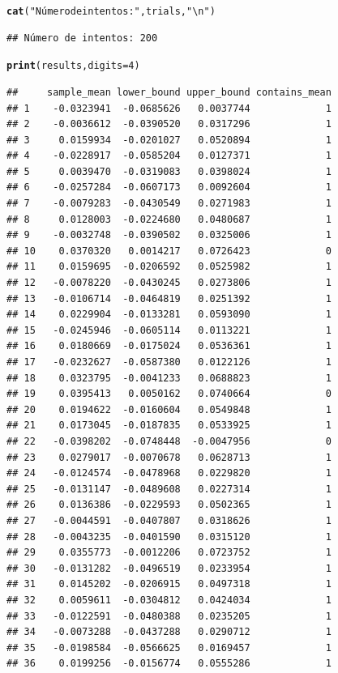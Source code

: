\documentclass[12pt]{article}\usepackage[]{graphicx}\usepackage[]{xcolor}
\makeatletter
\newcommand{\hlnum}[1]{\textcolor[rgb]{0.686,0.059,0.569}{#1}}%
\newcommand{\hlsng}[1]{\textcolor[rgb]{0.192,0.494,0.8}{#1}}%
\newcommand{\hldef}[1]{\textcolor[rgb]{0.345,0.345,0.345}{#1}}%
\newcommand{\hlkwc}[1]{\textcolor[rgb]{0.333,0.667,0.333}{#1}}%
\newcommand{\hlkwd}[1]{\textcolor[rgb]{0.737,0.353,0.396}{\textbf{#1}}}%
\newenvironment{kframe}{%
 \def\at@end@of@kframe{}%
 \ifinner\ifhmode%
  \def\at@end@of@kframe{\end{minipage}}%
  \begin{minipage}{\columnwidth}%
 \fi\fi%
 \def\FrameCommand##1{\hskip\@totalleftmargin \hskip-\fboxsep
 \colorbox{shadecolor}{##1}\hskip-\fboxsep
     \hskip-\linewidth \hskip-\@totalleftmargin \hskip\columnwidth}%
 \MakeFramed {\advance\hsize-\width
   \@totalleftmargin\z@ \linewidth\hsize
   \@setminipage}}%
 {\par\unskip\endMakeFramed%
 \at@end@of@kframe}
\newenvironment{knitrout}{}{} %
\makeatother
\begin{document}
\begin{knitrout}
\begin{kframe}
\begin{alltt}
\hlkwd{cat}\hldef{(}\hlsng{"Número de intentos:"}\hldef{, trials,} \hlsng{"\textbackslash{}n"}\hldef{)}
\end{alltt}
\begin{verbatim}
## Número de intentos: 200
\end{verbatim}
\begin{alltt}
\hlkwd{print}\hldef{(results,} \hlkwc{digits}\hldef{=} \hlnum{4}\hldef{)}
\end{alltt}
\begin{verbatim}
##     sample_mean lower_bound upper_bound contains_mean
## 1    -0.0323941  -0.0685626   0.0037744             1
## 2    -0.0036612  -0.0390520   0.0317296             1
## 3     0.0159934  -0.0201027   0.0520894             1
## 4    -0.0228917  -0.0585204   0.0127371             1
## 5     0.0039470  -0.0319083   0.0398024             1
## 6    -0.0257284  -0.0607173   0.0092604             1
## 7    -0.0079283  -0.0430549   0.0271983             1
## 8     0.0128003  -0.0224680   0.0480687             1
## 9    -0.0032748  -0.0390502   0.0325006             1
## 10    0.0370320   0.0014217   0.0726423             0
## 11    0.0159695  -0.0206592   0.0525982             1
## 12   -0.0078220  -0.0430245   0.0273806             1
## 13   -0.0106714  -0.0464819   0.0251392             1
## 14    0.0229904  -0.0133281   0.0593090             1
## 15   -0.0245946  -0.0605114   0.0113221             1
## 16    0.0180669  -0.0175024   0.0536361             1
## 17   -0.0232627  -0.0587380   0.0122126             1
## 18    0.0323795  -0.0041233   0.0688823             1
## 19    0.0395413   0.0050162   0.0740664             0
## 20    0.0194622  -0.0160604   0.0549848             1
## 21    0.0173045  -0.0187835   0.0533925             1
## 22   -0.0398202  -0.0748448  -0.0047956             0
## 23    0.0279017  -0.0070678   0.0628713             1
## 24   -0.0124574  -0.0478968   0.0229820             1
## 25   -0.0131147  -0.0489608   0.0227314             1
## 26    0.0136386  -0.0229593   0.0502365             1
## 27   -0.0044591  -0.0407807   0.0318626             1
## 28   -0.0043235  -0.0401590   0.0315120             1
## 29    0.0355773  -0.0012206   0.0723752             1
## 30   -0.0131282  -0.0496519   0.0233954             1
## 31    0.0145202  -0.0206915   0.0497318             1
## 32    0.0059611  -0.0304812   0.0424034             1
## 33   -0.0122591  -0.0480388   0.0235205             1
## 34   -0.0073288  -0.0437288   0.0290712             1
## 35   -0.0198584  -0.0566625   0.0169457             1
## 36    0.0199256  -0.0156774   0.0555286             1

\end{verbatim}
\end{kframe}
\end{knitrout}
\end{document}
